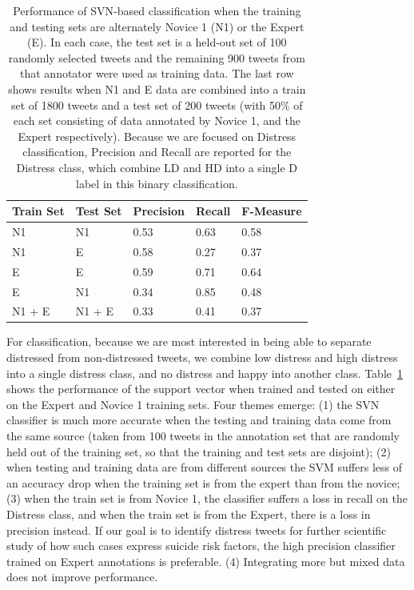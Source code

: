 \documentclass[11pt]{article}
\begin{document}
\begin{table}[h]
\small
\begin{tabular}{|l|l|l|l|l|}
\hline
Train Set         & Test Set          & Precision & Recall & F-Measure \\ \hline
N1          & N1          & 0.53      & 0.63   & 0.58      \\ \hline
N1          & E & 0.58       & 0.27   & 0.37       \\ \hline
E           & E     & 0.59      & 0.71   & 0.64      \\ \hline
E            & N1          & 0.34      & 0.85   & 0.48      \\ \hline
N1 + E & N1 + E & 0.33      & 0.41   &  0.37         \\ \hline
\end{tabular}
\caption{Performance of SVN-based classification when the training and testing sets are alternately Novice 1 (N1) or the Expert (E). In each case,  the test set is a held-out set of 100 randomly selected tweets and the remaining 900 tweets from that annotator were used as training data. The last row shows results when N1 and E data are combined into a train set of 1800 tweets and a test set of 200 tweets (with 50\% of each set consisting of data annotated by Novice 1, and the Expert respectively). Because we are focused on Distress classification, Precision and Recall are reported for the Distress class, which combine LD and HD into a single D label in this binary classification.}
\label{tab:svm}
\end{table}


For classification, because we are most interested in being able to separate distressed from non-distressed tweets, we combine low distress and high distress into a single distress class, and no distress and happy into another class. Table~\ref{tab:svm} shows the performance of the support vector when trained and tested on either on the Expert and Novice 1 training sets. Four themes emerge: (1) the SVN classifier is much more accurate when the testing and training data come from the same source (taken from 100 tweets in the annotation set that are randomly held out of the training set, so that the training and test sets are disjoint); (2) when testing and training data are from different sources the SVM suffers less of an accuracy drop when the training set is from the expert than from the novice; (3) when the train set is from Novice 1, the classifier suffers a loss in recall on the Distress class, and when the train set is from the Expert, there is a loss in precision instead. If our goal is to identify distress tweets for further scientific study of how such cases express suicide risk factors, the high precision classifier trained on Expert annotations is preferable. (4) Integrating more but mixed data does not improve performance.
\end{document}
